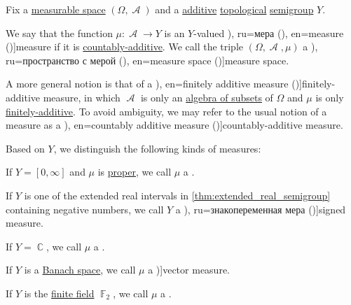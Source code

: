 \begin{definition}\label{def:measure}\mimprovised
  Fix a \hyperref[def:measurable_space]{measurable space} \( (\Omega, \mscrA) \) and a \hyperref[con:additive_semigroup]{additive} \hyperref[rem:topological_first_order_structures]{topological} \hyperref[def:semigroup]{semigroup} \( Y \).

  We say that the function \( \mu: \mscrA \to Y \) is an \( Y \)-valued \term[bg=мярка (\cite[def. 3.7]{Драганов2022ТеорияНаМярката}), ru=мера (\cite[def. I.1.6]{Ширяев2007ВероятностьТом1}), en=measure (\cite[7]{Cohn2013MeasureTheory})]{measure} if it is \hyperref[def:boolean_algebra_additive_function/countable]{countably-additive}. We call the triple \( (\Omega, \mscrA, \mu) \) a \term[bg=пространство с мярка (\cite[def. 3.9]{Драганов2022ТеорияНаМярката}), ru=пространство с мерой (\cite[def. 1.3.5]{Богачёв2003ОсновыТеорииМерыТом1}), en=measure space (\cite[8]{Cohn2013MeasureTheory})]{measure space}.

  A more general notion is that of a \term[ru=конечно аддитивная мера (\cite[def. I.1.2]{Ширяев2007ВероятностьТом1}), en=finitely additive measure (\cite[7]{Cohn2013MeasureTheory})]{finitely-additive measure}, in which \( \mscrA \) is only an \hyperref[def:algebra_of_subsets]{algebra of subsets} of \( \Omega \) and \( \mu \) is only \hyperref[def:boolean_algebra_additive_function/countable]{finitely-additive}. To avoid ambiguity, we may refer to the usual notion of a measure as a \term[ru=счётно аддитивная мера (\cite[def. I.1.6]{Ширяев2007ВероятностьТом1}), en=countably additive measure (\cite[7]{Cohn2013MeasureTheory})]{countably-additive measure}.

  Based on \( Y \), we distinguish the following kinds of measures:
  \begin{thmenum}
     If \( Y = [0, \infty] \) and \( \mu \) is \hyperref[def:effective_domain]{proper}, we call \( \mu \) a .

     If \( Y \) is one of the extended real intervals in \cref{thm:extended_real_semigroup} containing negative numbers, we call \( Y \) a \term[bg=знакопроменлива мярка (\cite[def. 10.1]{Драганов2022ТеорияНаМярката}), ru=знакопеременная мера (\cite[def. 20.1]{ДьяченкоУльянов1998МераИИнтеграл})]{signed measure}.

     If \( Y = \BbbC \), we call \( \mu \) a .

     If \( Y \) is a \hyperref[def:banach_space]{Banach space}, we call \( \mu \) a \term[ru=векторная мера (\cite[349]{ИоффеТихомиров1974ЭкстремальныеЗадачи})]{vector measure}.

     If \( Y \) is the \hyperref[def:finite_field]{finite field} \( \BbbF_2 \), we call \( \mu \) a .
  \end{thmenum}
\end{definition}

